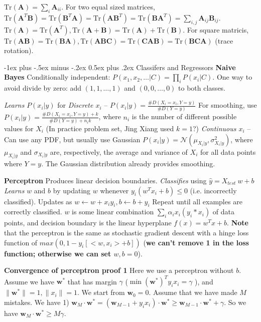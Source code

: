 \documentclass[10pt,landscape]{article}
\makeatletter
\newcommand{\vect}[1]{\boldsymbol{#1}}
\renewcommand{\section}{\@startsection{section}{1}{0mm}%
                                {-1ex plus -.5ex minus -.2ex}%
                                {0.5ex plus .2ex}%
                                {\normalfont\large\bfseries}}
\makeatother
\begin{document}
\begin{multicols}{3}
$\mathrm{Tr}(\vect{A}) = \sum_i \vect{A}_{ii}$. For two equal sized matrices, $\mathrm{Tr}(\vect{A}^T \vect{B}) = \mathrm{Tr}(\vect{B}^T \vect{A}) = \mathrm{Tr}(\vect{A} \vect{B}^T) = \mathrm{Tr}(\vect{B} \vect{A}^T) = \sum_{i,j} \vect{A}_{ij} \vect{B}_{ij}$. $\mathrm{Tr}(\vect{A}) = \mathrm{Tr}(\vect{A}^T), \mathrm{Tr}(\vect{A}+\vect{B})=\mathrm{Tr}(\vect{A})+\mathrm{Tr}(\vect{B})$. For square matricis, $\mathrm{Tr}(\vect{A}\vect{B})=\mathrm{Tr}(\vect{B}\vect{A}), \mathrm{Tr}(\vect{A}\vect{B}\vect{C})=\mathrm{Tr}(\vect{C}\vect{A}\vect{B})=\mathrm{Tr}(\vect{B}\vect{C}\vect{A})$ (trace rotation).




\section{Classifers and Regressors}
\textbf{Naive Bayes} Conditionally independent: $P(x_1,x_2,\ldots|C) = \prod_i P(x_i|C)$. One way to avoid divide by zero: add $(1,1,\ldots,1)$ and $(0,0,\ldots,0)$ to both classes. 

\emph{Learns} $P(x_i | y)$ for \emph{Discrete $x_i$} -- $P(x_i | y) = \frac{\#D(X_i = x_i, Y = y)}{\#D(Y = y)}$ 
For smoothing, use $P(x_i | y) = \frac{\#D(X_i = x_i, Y = y) + k}{\#D(Y = y) + n_i k}$, where $n_i$ is the number of different possible values for $X_i$ (In practice problem set, Jing Xiang used $k=1$?)
\emph{Continuous $x_i$} -- Can use any PDF, but usually use Gaussian $P(x_i | y) = \mathcal{N}(\mu_{X_i | y}, \sigma_{X_i | y}^2)$, where $\mu_{X_i | y}$ and $\sigma_{X_i | y}$ are, respectively, the average and variance of $X_i$ for all data points where $Y = y$. The Gaussian distribution already provides smoothing.

\textbf{Perceptron} Produces linear decision boundaries. \emph{Classifies} using $\hat{y} = X_{test}\:w + b$ \emph{Learns} $w$ and $b$ by updating $w$ whenever $y_i (w^T x_i + b) \leq 0$ (i.e. incorrectly classified). Updates as  $w \leftarrow w + x_i y_i, b \leftarrow b + y_i$ Repeat until all examples are correctly classified. $w$ is some linear combination $\sum_{i} \alpha_i x_i (y_i * x_i) $ of data points, and decision boundary is the linear hyperplane $f(x) = w^T x + b$. \textbf{Note} that the perceptron is the same as stochastic gradient descent with a hinge loss function of $max(0, 1 - y_i [<w, x_i> + b])$ (\textbf{we can't remove 1 in the loss function; otherwise we can set $w,b=0$}).

\textbf{Convergence of perceptron proof 1} Here we use a perceptron without $b$. Assume we have $\vect{w}^*$ that has margin $\gamma$ ($\min (\vect{w}^*)^T y_i x_i  = \gamma $ ), and $\|\vect{w}^*\| = 1, \|x_i\| = 1$. We start from $\vect{w}_0 = 0$. Assume that we have made $M$ mistakes. We have 1) $\vect{w}_M \cdot \vect{w}^*  = (\vect{w}_{M-1} + y_i x_i)\cdot \vect{w}^* \geq \vect{w}_{M-1} \cdot \vect{w}^* + \gamma$. So we have $\vect{w}_M \cdot \vect{w}^* \geq M \gamma$. 


\end{multicols}
\end{document}
